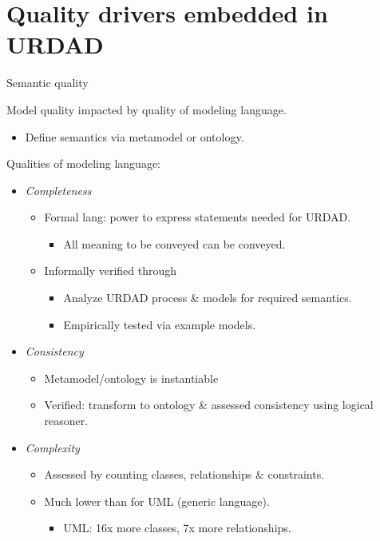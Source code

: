 \section{Quality drivers embedded in URDAD}


\begin{frame}{Semantic quality}

  Model quality impacted by quality of modeling language.
      \begin{itemize}
	\item Define semantics via metamodel or ontology.
      \end{itemize}
    \pause
    \begin{block}{Qualities of modeling language:}
      \begin{itemize}
	\item<+-| alert@+> {\em Completeness}
	\begin{itemize}
	  \item Formal lang: power to express statements needed for URDAD.
	    \begin{itemize}
	      \item All meaning to be conveyed can be conveyed.
	    \end{itemize}
	  \item Informally verified through
	    \begin{itemize}
	      \item Analyze URDAD process \& models for required semantics.
	      \item Empirically tested via example models.
	    \end{itemize}
	\end{itemize}
	\item<+-| alert@+> {\em Consistency}
	  \begin{itemize}
	    \item Metamodel/ontology is instantiable
	    \item Verified: transform to ontology \& assessed consistency using logical reasoner.
	  \end{itemize}
	\item<+-| alert@+> {\em Complexity}
	  \begin{itemize}
	    \item Assessed by counting classes, relationships \& constraints.
	    \item Much lower than for UML (generic language).
			 \begin{itemize}
				\item UML: 16x more classes, 7x more relationships.
			 \end{itemize}
	  \end{itemize}
      \end{itemize}
    \end{block}
\end{frame}


